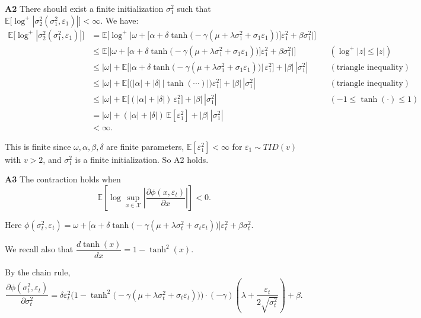 \documentclass[a4paper, 12pt]{article}
\theoremstyle{definition}
\begin{document}
\noindent \textbf{A2} There should exist a finite initialization $\sigma_1^2$ such that $\mathbb{E}\big[\log^+|\sigma_2^2(\sigma_1^2,\varepsilon_1)|\big]<\infty$. We have:
\begin{align*}
\mathbb{E}\big[\log^+|\sigma_2^2(\sigma_1^2,\varepsilon_1)|\big]
&= \mathbb{E}\Big[\log^+\Big|\omega+\big[\alpha+\delta\tanh\big(-\gamma(\mu+\lambda\sigma_1^2+\sigma_1\varepsilon_1)\big)\big]\varepsilon_1^2+\beta\sigma_1^2\Big|\Big] \\[4pt]
&\le \mathbb{E}\Big[\Big|\omega+\big[\alpha+\delta\tanh\big(-\gamma(\mu+\lambda\sigma_1^2+\sigma_1\varepsilon_1)\big)\big]\varepsilon_1^2+\beta\sigma_1^2\Big|\Big] && (\log^+|z|\le|z|) \\[4pt]
&\le |\omega| + \mathbb{E}\Big[\big|\alpha+\delta\tanh\big(-\gamma(\mu+\lambda\sigma_1^2+\sigma_1\varepsilon_1)\big)\big|\,\varepsilon_1^2\Big] + |\beta|\,|\sigma_1^2| &&(\text{triangle inequality}) \\[4pt]
&\le |\omega| + \mathbb{E}\Big[\big(|\alpha|+|\delta|\,|\tanh(\cdots)|\big)\varepsilon_1^2\Big] + |\beta|\,|\sigma_1^2| &&(\text{triangle inequality}) \\[4pt]
&\le |\omega| + \mathbb{E}\big[(|\alpha|+|\delta|)\,\varepsilon_1^2\big] + |\beta|\,|\sigma_1^2| &&(-1\le\tanh(\cdot)\le1) \\[4pt]
&= |\omega| + (|\alpha|+|\delta|)\,\mathbb{E}[\varepsilon_1^2] + |\beta|\,|\sigma_1^2| \\[4pt]
&< \infty.
\end{align*}

\par This is finite since $\omega,\alpha,\beta,\delta$ are finite parameters, $\mathbb{E}[\varepsilon_1^2]<\infty$ for $\varepsilon_1\sim TID(v)$ with $v>2$, and $\sigma_1^2$ is a finite initialization. So A2 holds.

\bigskip

\noindent \textbf{A3} The contraction holds when
\[
\mathbb{E}\left[\log\sup_{x\in\mathcal{X}}\left|\frac{\partial\phi(x,\varepsilon_t)}{\partial x}\right|\right]<0.
\]

\par Here $\phi(\sigma_t^2,\varepsilon_t)=\omega+\big[\alpha+\delta\tanh\big(-\gamma(\mu+\lambda\sigma_t^2+\sigma_t\varepsilon_t)\big)\big]\varepsilon_t^2+\beta\sigma_t^2$.
 
\par We recall also that $\dfrac{d\tanh(x)}{dx}=1-\tanh^2(x)$.
 
\par By the chain rule,
\[
\frac{\partial\phi(\sigma_t^2,\varepsilon_t)}{\partial\sigma_t^2}=\delta\varepsilon_t^2\Big(1-\tanh^2\big(-\gamma(\mu+\lambda\sigma_t^2+\sigma_t\varepsilon_t)\big)\Big)\cdot(-\gamma)\left(\lambda+\frac{\varepsilon_t}{2\sqrt{\sigma_t^2}}\right)+\beta.
\]
\end{document}
